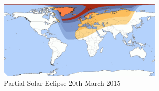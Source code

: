 \documentclass[runningheads,a4paper]{llncs}
\begin{document}
%
\begin{figure}[here]
	\centering
	\includegraphics[width=8cm]{images/41}
	\caption{Partial Solar Eclipse 20th March 2015 \citep{eclipse-15}}
	\label{fig:solar_eclipse_scale}
\end{figure}
%


%


%
\end{document}
